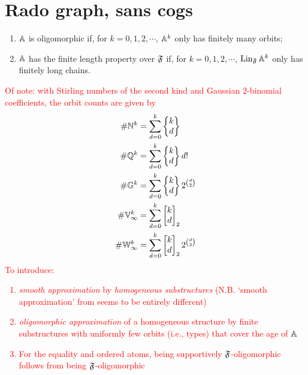 \section{Rado graph, sans cogs}

\begin{enumerate}
    \item $\mathbb{A}$ is oligomorphic if, for $k = 0, 1, 2, \cdots$, $\mathbb{A}^k$ only has finitely many orbits;
    \item $\mathbb{A}$ has the finite length property over $\mathfrak{F}$ if, for $k = 0, 1, 2, \cdots$, $\operatorname{Lin}_{\mathfrak{F}} \mathbb{A}^k$ only has finitely long chains.
\end{enumerate}
\textcolor{red}{
Of note: with Stirling numbers of the second kind and Gaussian $2$-binomial coefficients,
the orbit counts are given by
\begin{align*}
    \# \mathbb{N}^k &= \sum_{d=0}^k \begin{Bmatrix} k \\ d \end{Bmatrix} \\
    \# \mathbb{Q}^k &= \sum_{d=0}^k \begin{Bmatrix} k \\ d \end{Bmatrix} d! \\
    \# \mathbb{G}^k &= \sum_{d=0}^k \begin{Bmatrix} k \\ d \end{Bmatrix} 2^{\binom{d}{2}} \\
    \# \mathbb{V}_\infty^k &= \sum_{d=0}^k \begin{bmatrix} k \\ d \end{bmatrix}_2 \\
    \# \mathbb{W}_\infty^k &= \sum_{d=0}^k \begin{bmatrix} k \\ d \end{bmatrix}_2 2^{\binom{d}{2}}
\end{align*}
To introduce: 
\begin{enumerate}
    \item 
    \emph{smooth approximation} by \emph{homogeneous substructures} \cite{KLM89} (N.B. `smooth approximation' from \cite[Definition~4]{MP24} seems to be entirely different)
    \item 
    \emph{oligomorphic approximation} of a homogeneous structure by finite substructures with uniformly few orbits (i.e., types)
    that cover the age of $\mathbb{A}$
    \item 
    For the equality and ordered atoms, being supportively $\mathfrak{F}$-oligomorphic follows from being $\mathfrak{F}$-oligomorphic \cite[Theorem~4.10]{BFKM24}
\end{enumerate}}


